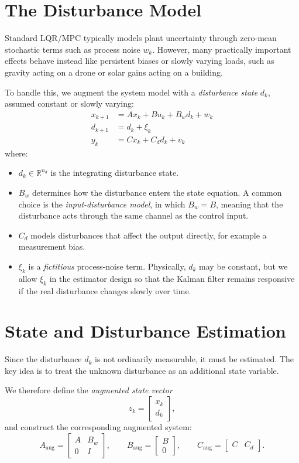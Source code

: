 \section{The Disturbance Model}

Standard LQR/MPC typically models plant uncertainty through zero-mean stochastic terms such as process noise \(w_k\). However, many practically important effects behave instead like persistent biases or slowly varying loads, such as gravity acting on a drone or solar gains acting on a building.

To handle this, we augment the system model with a \emph{disturbance state} \(d_k\), assumed constant or slowly varying:
\begin{align}
	x_{k+1} &= A x_k + B u_k + B_w d_k + w_k \label{eq:aug_sys_x}\\
	d_{k+1} &= d_k + \xi_k \label{eq:aug_sys_d}\\
	y_k &= C x_k + C_d d_k + v_k \nonumber
\end{align}
where:
\begin{itemize}
	\item \(d_k \in \mathbb{R}^{n_d}\) is the integrating disturbance state.
	\item \(B_w\) determines how the disturbance enters the state equation. A common choice is the \emph{input-disturbance model}, in which \(B_w = B\), meaning that the disturbance acts through the same channel as the control input.
	\item \(C_d\) models disturbances that affect the output directly, for example a measurement bias.
	\item \(\xi_k\) is a \emph{fictitious} process-noise term. Physically, \(d_k\) may be constant, but we allow \(\xi_k\) in the estimator design so that the Kalman filter remains responsive if the real disturbance changes slowly over time.
\end{itemize}

\section{State and Disturbance Estimation}

Since the disturbance \(d_k\) is not ordinarily measurable, it must be estimated. The key idea is to treat the unknown disturbance as an additional state variable.

We therefore define the \emph{augmented state vector}
\[
z_k = \begin{bmatrix} x_k \\ d_k \end{bmatrix},
\]
and construct the corresponding augmented system:
\[
A_{\mathrm{aug}} =
\begin{bmatrix}
	A & B_w \\
	0 & I
\end{bmatrix}, \qquad
B_{\mathrm{aug}} =
\begin{bmatrix}
	B \\
	0
\end{bmatrix}, \qquad
C_{\mathrm{aug}} =
\begin{bmatrix}
	C & C_d
\end{bmatrix}.
\]

